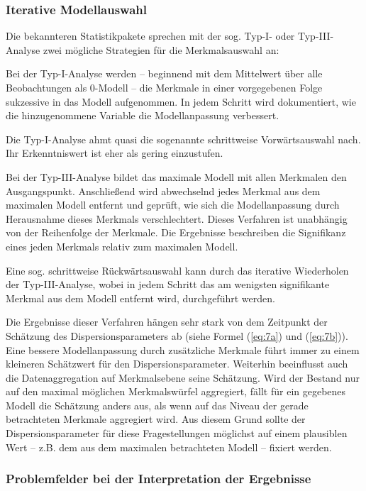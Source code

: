 \subsubsection{Iterative Modellauswahl}

Die bekannteren Statistikpakete sprechen mit der sog. Typ-I- oder Typ-III-Analyse zwei mögliche Strategien für die Merkmalsauswahl an:

Bei der Typ-I-Analyse werden – beginnend mit dem Mittelwert über alle Beobachtungen als 0-Modell – die Merkmale in einer vorgegebenen Folge sukzessive in das Modell aufgenommen. In jedem Schritt wird dokumentiert, wie die hinzugenommene Variable die Modellanpassung verbessert.

Die Typ-I-Analyse ahmt quasi die sogenannte schrittweise Vorwärtsauswahl nach. Ihr Erkenntniswert ist eher als gering einzustufen.

Bei der Typ-III-Analyse bildet das maximale Modell mit allen Merkmalen den Ausgangspunkt. Anschließend wird abwechselnd jedes Merkmal aus dem maximalen Modell entfernt und geprüft, wie sich die Modellanpassung durch Herausnahme dieses Merkmals verschlechtert. Dieses Verfahren ist unabhängig von der Reihenfolge der Merkmale. Die Ergebnisse beschreiben die Signifikanz eines jeden Merkmals relativ zum maximalen Modell.

Eine sog. schrittweise Rückwärtsauswahl kann durch das iterative Wiederholen der Typ-III-Analyse, wobei in jedem Schritt das am wenigsten signifikante Merkmal aus dem Modell entfernt wird, durchgeführt werden.

Die Ergebnisse dieser Verfahren hängen sehr stark von dem Zeitpunkt der Schätzung des Dispersionsparameters ab (siehe Formel (\ref{eq:7a}) und (\ref{eq:7b})). Eine bessere Modellanpassung durch zusätzliche Merkmale führt immer zu einem kleineren Schätzwert für den Dispersionsparameter. Weiterhin beeinflusst auch die Datenaggregation auf Merkmalsebene seine Schätzung. Wird der Bestand nur auf den maximal möglichen Merkmalswürfel aggregiert, fällt für ein gegebenes Modell die Schätzung anders aus, als wenn auf das Niveau der gerade betrachteten Merkmale aggregiert wird. Aus diesem Grund sollte der Dispersionsparameter für diese Fragestellungen möglichst auf einem plausiblen Wert – z.B. dem aus dem maximalen betrachteten Modell – fixiert werden.

\subsubsection{Problemfelder bei der Interpretation der Ergebnisse}

